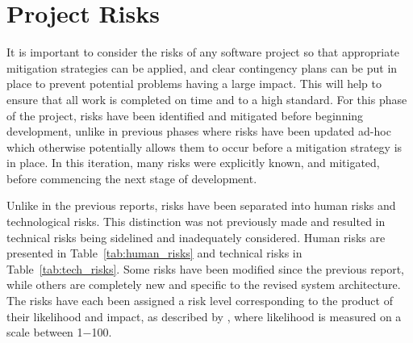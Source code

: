 \documentclass[10pt,a4paper]{article}
\begin{document}
\section{Project Risks}
\label{sec:risks}
It is important to consider the risks of any software project so that appropriate mitigation strategies can be applied, and clear contingency plans can be put in place to prevent potential problems having a large impact. This will help to ensure that all work is completed on time and to a high standard. For this phase of the project, risks have been identified and mitigated before beginning development, unlike in previous phases where risks have been updated ad-hoc which otherwise potentially allows them to occur before a mitigation strategy is in place. In this iteration, many risks were explicitly known, and mitigated, before commencing the next stage of development. 

Unlike in the previous reports, risks have been separated into human risks and technological risks. This distinction was not previously made and resulted in technical risks being sidelined and inadequately considered. Human risks are presented in Table~\ref{tab:human_risks} and technical risks in Table~\ref{tab:tech_risks}.
Some risks have been modified since the previous report, while others are completely new and specific to the revised system architecture. The risks have each been assigned a risk level corresponding to the product of their likelihood and impact, as described by \cite{risks}, where likelihood is measured on a scale between 1$-$100.
\end{document}

